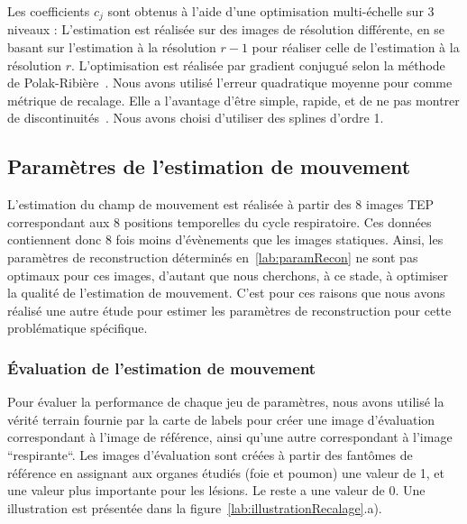Les coefficients $c_j$ sont obtenus à l'aide d'une optimisation multi-échelle sur 3 niveaux : L'estimation est réalisée sur des images de résolution différente, en se basant sur l'estimation à la résolution $r-1$ pour réaliser celle de l'estimation à la résolution $r$. L'optimisation est réalisée par gradient conjugué selon la méthode de Polak-Ribière~\cite{polak1969note}. Nous avons utilisé l'erreur quadratique moyenne pour comme métrique de recalage. Elle a l'avantage d'être simple, rapide, et de ne pas montrer de discontinuités~\cite{ledesma2005spatio}. Nous avons choisi d'utiliser des splines d'ordre 1.


\subsection{Paramètres de l'estimation de mouvement}


L'estimation du champ de mouvement est réalisée à partir des 8 images TEP correspondant aux 8 positions temporelles du cycle respiratoire. Ces données contiennent donc 8 fois moins d'évènements que les images statiques. Ainsi, les paramètres de reconstruction déterminés en~\ref{lab:paramRecon} ne sont pas optimaux pour ces images, d'autant que nous cherchons, à ce stade, à optimiser la qualité de l'estimation de mouvement. C'est pour ces raisons que nous avons réalisé une autre étude pour estimer les paramètres de reconstruction pour cette problématique spécifique. 


\subsubsection{\'Evaluation de l'estimation de mouvement}

Pour évaluer la performance de chaque jeu de paramètres, nous avons utilisé la vérité terrain fournie par la carte de labels pour créer une image d'évaluation correspondant à l'image de référence, ainsi qu'une autre correspondant à l'image ``respirante``. Les images d'évaluation sont créées à partir des fantômes de référence en assignant aux organes étudiés (foie et poumon) une valeur de 1, et une valeur plus importante pour les lésions. Le reste a une valeur de 0. Une illustration est présentée dans la figure~\ref{lab:illustrationRecalage}.a). 

